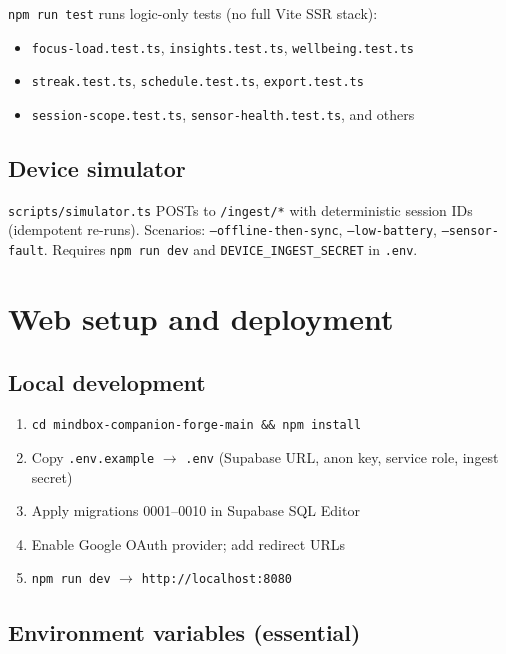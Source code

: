 \documentclass[11pt,a4paper]{report}
\newcommand{\filepath}[1]{\texttt{#1}}
\begin{document}
\filepath{npm run test} runs logic-only tests (no full Vite SSR stack):
\begin{itemize}[leftmargin=*]
  \item \filepath{focus-load.test.ts}, \filepath{insights.test.ts}, \filepath{wellbeing.test.ts}
  \item \filepath{streak.test.ts}, \filepath{schedule.test.ts}, \filepath{export.test.ts}
  \item \filepath{session-scope.test.ts}, \filepath{sensor-health.test.ts}, and others
\end{itemize}

\section{Device simulator}

\filepath{scripts/simulator.ts} POSTs to \texttt{/ingest/*} with deterministic session IDs
(idempotent re-runs). Scenarios: \texttt{--offline-then-sync}, \texttt{--low-battery},
\texttt{--sensor-fault}. Requires \texttt{npm run dev} and \texttt{DEVICE\_INGEST\_SECRET} in \filepath{.env}.

\chapter{Web setup and deployment}

\section{Local development}

\begin{enumerate}[leftmargin=*]
  \item \texttt{cd mindbox-companion-forge-main \&\& npm install}
  \item Copy \filepath{.env.example} $\rightarrow$ \filepath{.env} (Supabase URL, anon key, service role, ingest secret)
  \item Apply migrations 0001--0010 in Supabase SQL Editor
  \item Enable Google OAuth provider; add redirect URLs
  \item \texttt{npm run dev} $\rightarrow$ \texttt{http://localhost:8080}
\end{enumerate}

\section{Environment variables (essential)}
\end{document}
